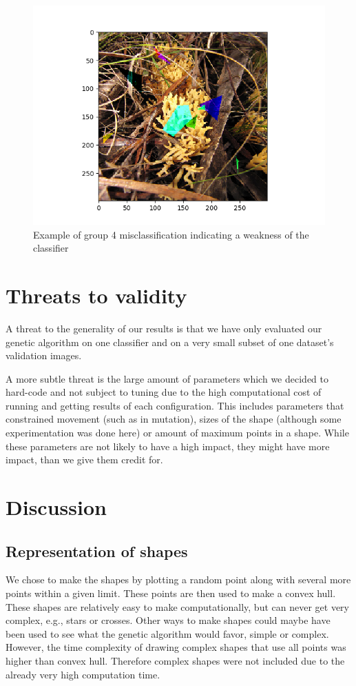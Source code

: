 \documentclass[conference]{IEEEtran}
\begin{document}
\begin{figure}[htbp]
\centering
  \includegraphics[width=1\linewidth]{fig/coralfungus-ant.png}
\caption{Example of group 4 misclassification indicating a weakness of the classifier}
\label{fig:ant}
\end{figure}

\section{Threats to validity}
A threat to the generality of our results is that we have only evaluated our genetic algorithm on one classifier and on a very small subset of one dataset's validation images.

A more subtle threat is the large amount of parameters which we decided to hard-code and not subject to tuning due to the high computational cost of running and getting results of each configuration.
This includes parameters that constrained movement (such as in mutation), sizes of the shape (although some experimentation was done here) or amount of maximum points in a shape.
While these parameters are not likely to have a high impact, they might have more impact, than we give them credit for. 


\section{Discussion}
\subsection{Representation of shapes}
We chose to make the shapes by plotting a random point along with several more points within a given limit.
These points are then used to make a convex hull.
These shapes are relatively easy to make computationally, but can never get very complex, e.g., stars or crosses.
Other ways to make shapes could maybe have been used to see what the genetic algorithm would favor, simple or complex.
However, the time complexity of drawing complex shapes that use all points was higher than convex hull.
Therefore complex shapes were not included due to the already very high computation time.
\end{document}
